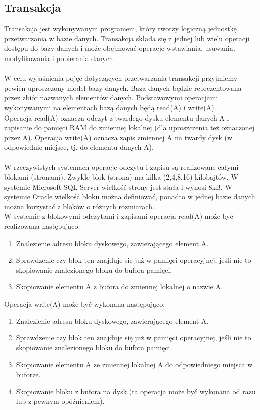 \documentclass[main.tex]{subfiles}
\begin{document}
    \subsection{Transakcja}
    Transakcja jest wykonywanym programem, który tworzy logiczną jednostkę przetwarzania w
    bazie danych. Transakcja składa się z jednej lub wielu operacji dostępu do bazy danych i może
    obejmować operacje wstawiania, usuwania, modyfikowania i pobierania danych.
    \\\\
    W celu wyjaśnienia pojęć dotyczących przetwarzania transakcji przyjmiemy pewien uproszczony
    model bazy danych. Baza danych będzie reprezentowana przez zbiór nazwanych elementów
    danych. Podstawowymi operacjami wykonywanymi na elementach bazą danych będą read(A) i
    write(A).
    \\
    Operacja read(A) oznacza odczyt z twardego dysku elementu danych A i zapisanie do pamięci
    RAM do zmiennej lokalnej (dla uproszczenia też oznaczonej przez A). Operacja write(A) oznacza
    zapis zmiennej A na twardy dysk (w odpowiednie miejsce, tj. do elementu danych A).
    \\\\
    W rzeczywistych systemach operacje odczytu i zapisu są realizowane całymi blokami (stronami).
    Zwykle blok (strona) ma kilka (2,4,8,16) kilobajtów. W systemie Microsoft SQL Server wielkość
    strony jest stała i wynosi 8kB. W systemie Oracle wielkość bloku można definiować, ponadto w
    jednej bazie danych można korzystać z bloków o różnych rozmiarach.\\

    W systemie z blokowymi odczytami i zapisami operacja read(A) może być realizowana
    następująco:
    \begin{enumerate}
        \item Znalezienie adresu bloku dyskowego, zawierającego element A.
        \item Sprawdzenie czy blok ten znajduje się już w pamięci operacyjnej, jeśli nie to skopiowanie
        znalezionego bloku do bufora pamięci.
        \item Skopiowanie elementu A z bufora do zmiennej lokalnej o nazwie A.
    \end{enumerate}

    Operacja write(A) może być wykonana następująco:
    \begin{enumerate}
        \item Znalezienie adresu bloku dyskowego, zawierającego element A.
        \item Sprawdzenie czy blok ten znajduje się już w pamięci operacyjnej, jeśli nie to skopiowanie
        znalezionego bloku do bufora pamięci.
        \item Skopiowanie elementu A ze zmiennej lokalnej A do odpowiedniego miejsca w buforze.
        \item Skopiowanie bloku z bufora na dysk (ta operacja może być wykonana od razu lub z
        pewnym opóźnieniem).
    \end{enumerate}
\end{document}
